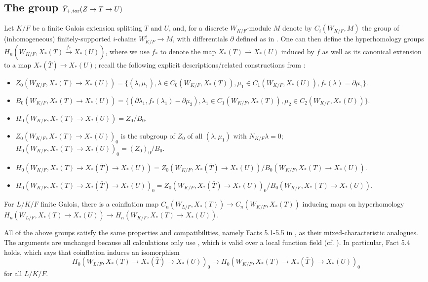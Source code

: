 \documentclass{amsart}
\theoremstyle{definition}
\theoremstyle{remark}
\begin{document}
\subsection{The group $\bar{Y}_{+,\textnormal{tor}}(Z \to T \to U)$}
Let $K/F$ be a finite Galois extension splitting $T$ and $U$, and, for a discrete $W_{K/F}$-module $M$ denote by $C_{i}(W_{K/F},M)$ the group of (inhomogeneous) finitely-supported $i$-chains $W_{K/F}^{i} \to M$, with differentials $\partial$ defined as in \cite[\S 5.1]{Kal26b}. One can then define the hyperhomology groups $H_{n}(W_{K/F}, X_{*}(T) \xrightarrow{f_{*}} X_{*}(U))$, where we use $f_{*}$ to denote the map $X_{*}(T) \to X_{*}(U)$ induced by $f$ as well as its canonical extension to a map $X_{*}(\bar{T}) \to X_{*}(U)$; recall the following explicit descriptions/related constructions from \cite[\S 5.1]{Kal26b}: 
\begin{itemize}
    \item{$Z_{0}(W_{K/F}, X_{*}(T) \to X_{*}(U)) = \{(\lambda,\mu_{1}), \lambda \in C_{0}(W_{K/F}, X_{*}(T)), \mu_{1} \in C_{1}(W_{K/F},X_{*}(U)), f_{*}(\lambda) = \partial \mu_{1}\}$.}
    \item{$B_{0}(W_{K/F}, X_{*}(T) \to X_{*}(U)) = \{(\partial \lambda_{1}, f_{*}(\lambda_{1})-\partial \mu_{2}),  \lambda_{1} \in C_{1}(W_{K/F},X_{*}(T)), \mu_{2} \in  C_{2}(W_{K/F},X_{*}(U))\}$.}
    \item{$H_{0}(W_{K/F}, X_{*}(T) \to X_{*}(U)) =Z_{0}/B_{0}$.}
    \item{$Z_{0}(W_{K/F}, X_{*}(T) \to X_{*}(U))_{0}$ is the subgroup of $Z_{0}$ of all $(\lambda,\mu_{1})$ with $N_{K/F}\lambda=0$; $H_{0}(W_{K/F}, X_{*}(T) \to X_{*}(U))_{0} = (Z_{0})_{0}/B_{0}$.}
    \item{$H_{0}(W_{K/F}, X_{*}(T) \to X_{*}(\bar{T}) \to X_{*}(U)) = Z_{0}(W_{K/F}, X_{*}(\bar{T}) \to X_{*}(U))/B_{0}(W_{K/F}, X_{*}(T) \to X_{*}(U)).$}  
     \item{$H_{0}(W_{K/F}, X_{*}(T) \to X_{*}(\bar{T}) \to X_{*}(U))_{0} = Z_{0}(W_{K/F}, X_{*}(\bar{T}) \to X_{*}(U))_{0}/B_{0}(W_{K/F}, X_{*}(T) \to X_{*}(U)).$}
    
\end{itemize}
For $L/K/F$ finite Galois, there is a coinflation map \cite[\S 5.1]{Kal26b} $C_{n}(W_{L/F},X_{*}(T)) \to C_{n}(W_{K/F},X_{*}(T))$ inducing maps on hyperhomology $H_{n}(W_{L/F}, X_{*}(T) \to X_{*}(U)) \to H_{n}(W_{K/F}, X_{*}(T) \to X_{*}(U))$. 

All of the above groups satisfy the same properties and compatibilities, namely Facts 5.1-5.5 in \cite{Kal26b}, as their mixed-characteristic analogues. The arguments are unchanged because all calculations only use \cite[\S A.3]{KS99}, which is valid over a local function field (cf. \cite[\S A.2]{Dillery23b}). In particular, Fact 5.4 holds, which says that coinflation induces an isomorphism 
\begin{equation*}
    H_{0}(W_{L/F}, X_{*}(T) \to X_{*}(\bar{T}) \to X_{*}(U))_{0} \to H_{0}(W_{K/F}, X_{*}(T) \to X_{*}(\bar{T}) \to X_{*}(U))_{0}
\end{equation*}
for all $L/K/F$.
\end{document}
